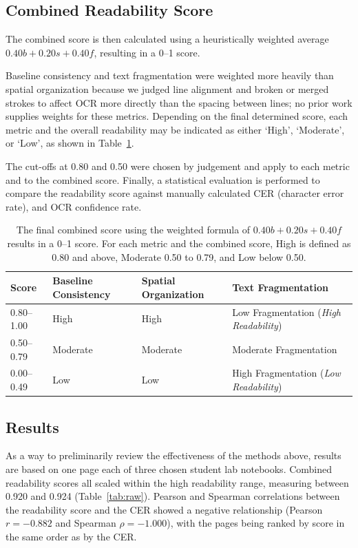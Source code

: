 \documentclass[conference]{IEEEtran}
\begin{document}
\subsection{Combined Readability Score}
The combined score is then calculated using a heuristically weighted average
$0.40b + 0.20s + 0.40f$, resulting in a 0--1 score.

Baseline consistency and text fragmentation were weighted more heavily than
spatial organization because we judged line alignment and broken or merged
strokes to affect OCR more directly than the spacing between lines; no prior
work supplies weights for these metrics.
Depending on the final determined score, each metric and the overall
readability may be indicated as either `High', `Moderate', or `Low', as shown
in Table~\ref{tab:bands}.

The cut-offs at 0.80 and 0.50 were chosen by judgement and apply to each metric and to the combined score. Finally, a statistical evaluation is performed to compare the readability score against manually calculated CER (character error rate), and OCR confidence
rate.

\begin{table}[!t]
  \centering
  \caption{The final combined score using the weighted formula of
  $0.40b + 0.20s + 0.40f$ results in a 0--1 score. For each metric and the
  combined score, High is defined as 0.80 and above, Moderate 0.50 to 0.79, and
  Low below 0.50.}
  \label{tab:bands}
  \footnotesize
  \setlength{\tabcolsep}{3pt}
  \renewcommand{\arraystretch}{1.15}
  \begin{tabular}{@{}l>{\raggedright\arraybackslash}p{1.45cm}>{\raggedright\arraybackslash}p{1.55cm}>{\raggedright\arraybackslash}p{2.6cm}@{}}
    \toprule
    Score & Baseline Consistency & Spatial Organization & Text Fragmentation \\
    \midrule
    \rowcolor{green!15}
    0.80--1.00 & High     & High     & Low Fragmentation (\emph{High Readability}) \\
    \rowcolor{yellow!20}
    0.50--0.79 & Moderate & Moderate & Moderate Fragmentation \\
    \rowcolor{red!12}
    0.00--0.49 & Low      & Low      & High Fragmentation (\emph{Low Readability}) \\
    \bottomrule
  \end{tabular}
\end{table}

\subsection{Results}
As a way to preliminarily review the effectiveness of the methods above, results are based on one page each of three chosen student lab notebooks.
Combined readability scores all scaled within the high readability range,
measuring between 0.920 and 0.924 (Table~\ref{tab:raw}). Pearson and Spearman
correlations between the readability score and the CER showed a negative
relationship (Pearson $r = -0.882$ and Spearman $\rho = -1.000$), with the pages
being ranked by score in the same order as by the CER.
\end{document}

